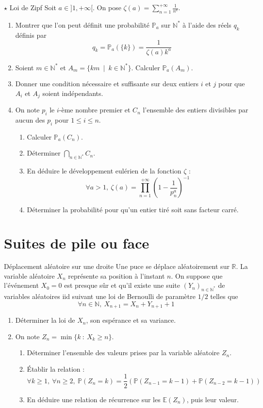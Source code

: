 \documentclass[french,a4paper]{article}
\renewcommand{\P}{\mathbb{P}}
\newcommand{\N}{\mathbb{N}}
\newcommand{\R}{\mathbb{R}}
\newcommand{\st}{^*}
\newcommand{\inv}{^{-1}}
\newcommand{\E}{\mathbb{E}}
\theoremstyle{plain}
\theoremstyle{definition}
\theoremstyle{remark}
\begin{document}
\begin{ex}[Châteaux]{$\star$ Loi de Zipf}
	Soit $a\in]1,+\infty[$. On pose $\zeta(a)=\displaystyle\sum_{n=1}^{+\infty}\frac{1}{n^a}$.
	\begin{enumerate}
		\item Montrer que l'on peut définit une probabilité $\P_a$ sur $\N\st$ à l'aide des réels $q_k$ définis par $$q_k=\P_a(\{k\})=\frac{1}{\zeta(a)k^a}$$
		\item Soient $m\in\N\st$ et $A_m=\{km\ \mid \ k\in\N\st\}$. Calculer $\P_a(A_m)$.
		\item Donner une condition nécessaire et suffisante sur deux entiers $i$ et $j$ pour que $A_i$ et $A_j$ soient indépendants.
		\item On note $p_i$ le $i$-ème nombre premier et $C_n$ l'ensemble des entiers divisibles par aucun des $p_i$ pour $1\leqslant i\leqslant n$.
		\begin{enumerate}[label=\alph*.]
			\item Calculer $\P_a(C_n)$.
			\item Déterminer $\displaystyle\bigcap_{n\in\N\st}C_n$.
			\item En déduire le développement eulérien de la fonction $\zeta$ : $$\forall a>1,\ \zeta(a)=\prod_{n=1}^{+\infty}\left(1-\frac{1}{p_n^a}\right)\inv$$
			\item Déterminer la probabilité pour qu'un entier tiré soit sans facteur carré.
		\end{enumerate}
	\end{enumerate}
\end{ex}

\section{Suites de pile ou face}

\begin{ex}{Déplacement aléatoire sur une droite}
	Une puce se déplace aléatoirement sur $\R$. La variable aléatoire $X_n$ représente sa position à l'instant $n$. On suppose que l'événement $X_0=0$ est presque sûr et qu'il existe une suite $(Y_n)_{n\in\N\st}$ de variables aléatoires iid suivant une loi de Bernoulli de paramètre $1/2$ telles que $$\forall n\in\N,\ X_{n+1}=X_n+Y_{n+1}+1$$
	\begin{enumerate}
		\item Déterminer la loi de $X_n$, son espérance et sa variance.
		\item On note $Z_n=\min\{k\ :\ X_k\geqslant n\}$.
		\begin{enumerate}[label=\alph*.]
			\item Déterminer l'ensemble des valeurs prises par la variable aléatoire $Z_n$.
			\item Établir la relation : $$\forall k\geqslant 1,\ \forall n\geqslant 2,\ \P(Z_n=k)=\frac12\left(\P(Z_{n-1}=k-1)+\P(Z_{n-2}=k-1)\right)$$
			\item En déduire une relation de récurrence sur les $\E(Z_n)$, puis leur valeur.
		\end{enumerate}
	\end{enumerate}
\end{ex}
\end{document}
